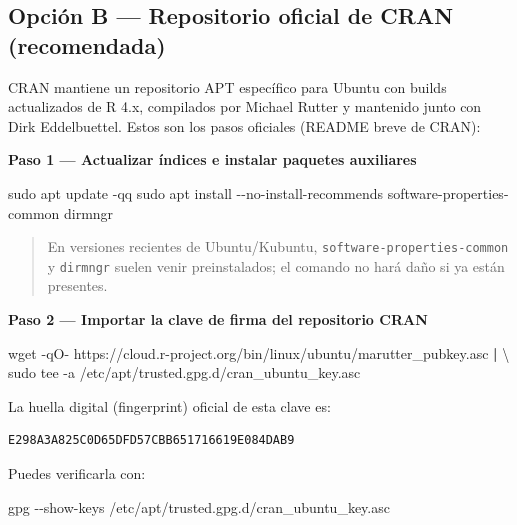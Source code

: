 \documentclass[
  man,
  floatsintext,
  longtable,
  a4paper,
  nolmodern,
  notxfonts,
  notimes,
  12pt,
  colorlinks=true,linkcolor=blue,citecolor=blue,urlcolor=blue]{apa7}
\newenvironment{Shaded}{\begin{snugshade}}{\end{snugshade}}
\newcommand{\AttributeTok}[1]{\textcolor[rgb]{0.40,0.45,0.13}{#1}}
\newcommand{\DataTypeTok}[1]{\textcolor[rgb]{0.68,0.00,0.00}{#1}}
\newcommand{\ExtensionTok}[1]{\textcolor[rgb]{0.00,0.23,0.31}{#1}}
\newcommand{\FunctionTok}[1]{\textcolor[rgb]{0.28,0.35,0.67}{#1}}
\newcommand{\KeywordTok}[1]{\textcolor[rgb]{0.00,0.23,0.31}{\textbf{#1}}}
\newcommand{\NormalTok}[1]{\textcolor[rgb]{0.00,0.23,0.31}{#1}}
\begin{document}
\subsection{Opción B --- Repositorio oficial de CRAN
(recomendada)}\label{opciuxf3n-b-repositorio-oficial-de-cran-recomendada}

CRAN mantiene un repositorio APT específico para Ubuntu con builds
actualizados de R 4.x, compilados por Michael Rutter y mantenido junto
con Dirk Eddelbuettel. Estos son los pasos oficiales (README breve de
CRAN):

\textbf{Paso 1 --- Actualizar índices e instalar paquetes auxiliares}

\begin{Shaded}
\begin{Highlighting}[]
\FunctionTok{sudo}\NormalTok{ apt update }\AttributeTok{{-}qq}
\FunctionTok{sudo}\NormalTok{ apt install }\AttributeTok{{-}{-}no{-}install{-}recommends}\NormalTok{ software{-}properties{-}common dirmngr}
\end{Highlighting}
\end{Shaded}

\begin{quote}
En versiones recientes de Ubuntu/Kubuntu,
\texttt{software-properties-common} y \texttt{dirmngr} suelen venir
preinstalados; el comando no hará daño si ya están presentes.
\end{quote}

\textbf{Paso 2 --- Importar la clave de firma del repositorio CRAN}

\begin{Shaded}
\begin{Highlighting}[]
\FunctionTok{wget} \AttributeTok{{-}qO{-}}\NormalTok{ https://cloud.r{-}project.org/bin/linux/ubuntu/marutter\_pubkey.asc }\KeywordTok{|} \DataTypeTok{\textbackslash{}}
  \FunctionTok{sudo}\NormalTok{ tee }\AttributeTok{{-}a}\NormalTok{ /etc/apt/trusted.gpg.d/cran\_ubuntu\_key.asc}
\end{Highlighting}
\end{Shaded}

La huella digital (fingerprint) oficial de esta clave es:

\begin{verbatim}
E298A3A825C0D65DFD57CBB651716619E084DAB9
\end{verbatim}

Puedes verificarla con:

\begin{Shaded}
\begin{Highlighting}[]
\ExtensionTok{gpg} \AttributeTok{{-}{-}show{-}keys}\NormalTok{ /etc/apt/trusted.gpg.d/cran\_ubuntu\_key.asc}
\end{Highlighting}
\end{Shaded}
\end{document}
